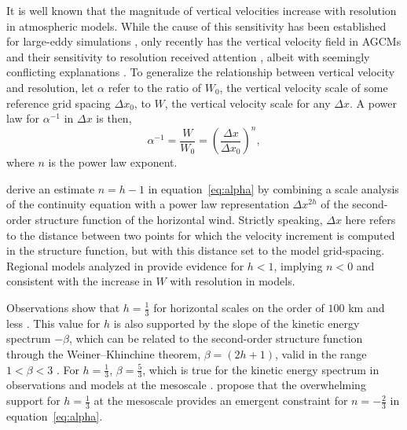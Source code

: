 \documentclass[alpha-refs]{wiley-article}
\begin{document}
It is well known that the magnitude of vertical velocities increase with resolution in atmospheric models. While the cause of this sensitivity has been established for large-eddy simulations \citep[see][and references therein]{J2017JAMES}, only recently has the vertical velocity field in AGCMs and their sensitivity to resolution received attention \citep{DETALA2016ACP,OETAL2016JAMES}, albeit with seemingly conflicting explanations \citep{RETAL2016CD,HR2018JAMES}. To generalize the relationship between vertical velocity and resolution, let $\alpha$ refer to the ratio of $W_0$, the vertical velocity scale of some reference grid spacing $\Delta x_0$, to $W$, the vertical velocity scale for any $\Delta x$. A power law for $\alpha^{-1}$ in $\Delta x$ is then,
\begin{equation}
\alpha^{-1} = \frac{W}{W_0} = \left( \frac{\Delta x}{\Delta x_0} \right)^n, \label{eq:alpha}
\end{equation}
where $n$ is the power law exponent. 

\cite{RETAL2016CD} derive an estimate $n= h-1$ in equation~\ref{eq:alpha} by combining a scale analysis of the continuity equation with a power law representation $\Delta x^{2h}$ of the second-order structure function of the horizontal wind. Strictly speaking, $\Delta x$ here refers to the distance between two points for which the velocity increment is computed in the structure function, but with this distance set to the model grid-spacing. Regional models analyzed in \cite{RETAL2016CD} provide evidence for $h<1$, implying $n<0$ and consistent with the increase in $W$ with resolution in models.

Observations show that $h=\frac{1}{3}$ for horizontal scales on the order of $100$ km and less \citep[hereafter referred to as the {\em{mesoscale}};][]{L1999JFM,CL2001JGR}. This value for $h$ is also supported by the slope of the kinetic energy spectrum $-\beta$, which can be related to the second-order structure function through the Weiner–Khinchine theorem, $\beta = \left( 2h+1 \right)$, valid in the range $1<\beta<3$ \citep[satisfies stationarity;][]{DETAL1996JAS}. For $h=\frac{1}{3}$, $\beta=\frac{5}{3}$, which is true for the kinetic energy spectrum in observations \citep{NG1985JAS,CETAL1999JGR} and models at the mesoscale \citep[e.g.,][]{THO2006GRL,SPKS2014JAS}. \cite{RETAL2016CD} propose that the overwhelming support for $h=\frac{1}{3}$ at the mesoscale provides an emergent constraint for $n=-\frac{2}{3}$ in equation~\ref{eq:alpha}.
\end{document}
